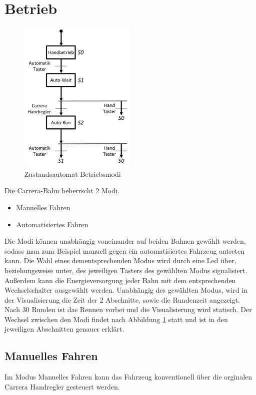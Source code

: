 \documentclass[a4paper, 11pt]{report}
\begin{document}
\section{Betrieb}
	\begin{figure}[ht]
		\centering
		\includegraphics[width=0.5\textwidth]{rec/modiAuswahl.png}
		\caption{Zustandsautomat Betriebsmodi}
		\label{img:Betriebsmodi}
	\end{figure}
	Die Carrera-Bahn beherrscht 2 Modi.
	\begin{itemize}
		\item Manuelles Fahren
		\item Automatisiertes Fahren
	\end{itemize}
	Die Modi können unabhängig voneinander auf beiden Bahnen gewählt werden, sodass man zum Beispiel manuell gegen ein automatisiertes Fahrzeug antreten kann. Die Wahl eines dementsprechenden Modus wird durch eine Led über, beziehungsweise unter, des jeweiligen Tasters des gewählten Modus signalisiert. Außerdem kann die Energieversorgung jeder Bahn mit dem entsprechenden Wechselschalter ausgewählt werden. Unabhängig des gewählten Modus, wird in der Visualisierung die Zeit der 2 Abschnitte, sowie die Rundenzeit angezeigt. Nach 30 Runden ist das Rennen vorbei und die Visualisierung wird statisch.
	Der Wechsel zwischen den Modi findet nach Abbildung \ref{img:Betriebsmodi} statt und ist in den jeweiligen Abschnitten genauer erklärt.
	\subsection{Manuelles Fahren}\label{subsec:ManuellesFahren}
		Im Modus Manuelles Fahren kann das Fahrzeug konventionell über die orginalen Carrera Handregler gesteuert
		werden.
\end{document}
